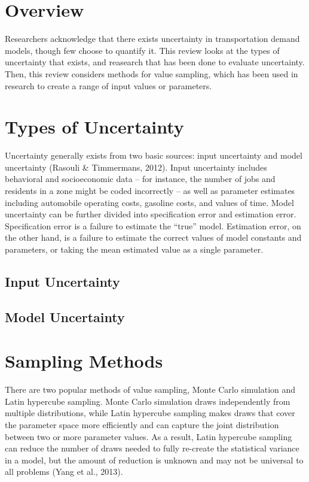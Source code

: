 \documentclass[fancy, masters,twoside]{byuthesis}
\begin{document}
\hypertarget{overview}{%
\section{Overview}\label{overview}}

Researchers acknowledge that there exists uncertainty in transportation demand models, though few choose to quantify it. This review looks at the types of uncertainty that exists, and reasearch that has been done to evaluate uncertainty. Then, this review considers methods for value sampling, which has been used in research to create a range of input values or parameters.

\hypertarget{types-of-uncertainty}{%
\section{Types of Uncertainty}\label{types-of-uncertainty}}

Uncertainty generally exists from two basic sources: input uncertainty and model uncertainty (Rasouli \& Timmermans, 2012). Input uncertainty includes behavioral and socioeconomic data -- for instance, the number of jobs and residents in a zone might be coded incorrectly -- as well as parameter estimates including automobile operating costs, gasoline costs, and values of time. Model uncertainty can be further divided into specification error and estimation error. Specification error is a failure to estimate the ``true'' model. Estimation error, on the other hand, is a failure to estimate the correct values of model constants and parameters, or taking the mean estimated value as a single parameter.

\hypertarget{input-uncertainty}{%
\subsection{Input Uncertainty}\label{input-uncertainty}}

\hypertarget{model-uncertainty}{%
\subsection{Model Uncertainty}\label{model-uncertainty}}

\hypertarget{sampling-methods}{%
\section{Sampling Methods}\label{sampling-methods}}

There are two popular methods of value sampling, Monte Carlo simulation and Latin hypercube sampling. Monte Carlo simulation draws independently from multiple distributions, while Latin hypercube sampling makes draws that cover the parameter space more efficiently and can capture the joint distribution between two or more parameter values. As a result, Latin hypercube sampling can reduce the number of draws needed to fully re-create the statistical variance in a model, but the amount of reduction is unknown and may not be universal to all problems (Yang et al., 2013).
\end{document}
